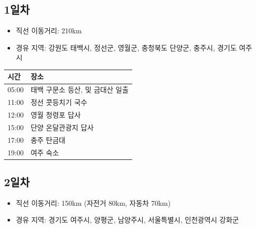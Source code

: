 \documentclass[chapter, oneside]{oblivoir}
\begin{document}
\subsection{1일차}
\begin{itemize}
    \item 직선 이동거리: 210km
    \item 경유 지역: 강원도 태백시, 정선군, 영월군, 충청북도 단양군, 충주시, 경기도 여주시
\end{itemize}

\begin{table}[ht]
    \begin{center}    
    \begin{tabular}{rl}
    \multicolumn{1}{l}{시간}     & \multicolumn{1}{l}{장소} \\ \hline
    \multicolumn{1}{r|}{05:00} & 태백 구문소 등산, 및 금대산   일출 \\
    \multicolumn{1}{r|}{11:00} & 정선 콧등치기   국수          \\
    \multicolumn{1}{r|}{12:00} & 영월 청령포 답사             \\
    \multicolumn{1}{r|}{15:00} & 단양   온달관광지 답사         \\
    \multicolumn{1}{r|}{17:00} & 충주   탄금대              \\
    \multicolumn{1}{r|}{19:00} & 여주   숙소              
    \end{tabular}
    \end{center}
\end{table}
\subsection{2일차}
\begin{itemize}
    \item 직선 이동거리: 150km (자전거 80km, 자동차 70km)
    \item 경유 지역: 경기도 여주시, 양평군, 남양주시, 서울특별시, 인천광역시 강화군
\end{itemize}
\end{document}
